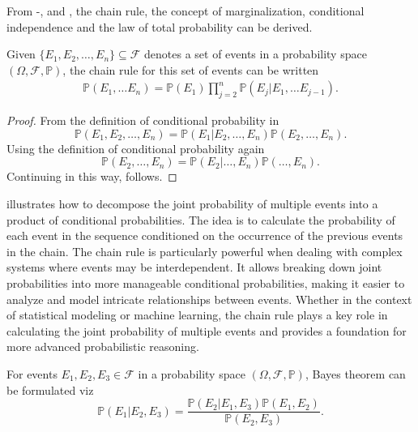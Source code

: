 From -,  and , the chain rule, the concept of marginalization, conditional independence and the law of total probability can be derived. 
\begin{theorem}
	\label{theorem:chain_rule}
	Given $\{E_1, E_2, \ldots, E_n\}\subseteq \mathcal{F}$ denotes a set of events in a probability space $(\Omega, \mathcal{F}, \mathbb{P})$, the chain rule for this set of events can be written
	\begin{equation}
		\begin{split}
			\mathbb{P}(E_1, \dots E_n) = \mathbb{P}(E_1)\prod_{j=2}^{n}\mathbb{P}(E_j|E_1,\dots E_{j-1}).
		\end{split}
		\label{eq:prod}
	\end{equation}
\end{theorem}
\begin{proof}
	From the definition of conditional probability in 
	\begin{equation}
		\mathbb{P}(E_1, E_2, \ldots, E_n) = \mathbb{P}(E_1|E_2, \dots, E_n)\mathbb{P}(E_2, \dots, E_n).
		\label{eq:p1}
	\end{equation}
	Using the definition of conditional probability again
	\begin{equation}
		\mathbb{P}(E_2, \ldots, E_n) = \mathbb{P}(E_2| \ldots, E_n)\mathbb{P}(\dots, E_n).
	\end{equation}
	Continuing in this way,  follows.
\end{proof}
 illustrates how to decompose the joint probability of multiple events into a product of conditional probabilities. The idea is to calculate the probability of each event in the sequence conditioned on the occurrence of the previous events in the chain. The chain rule is particularly powerful when dealing with complex systems where events may be interdependent. It allows breaking down joint probabilities into more manageable conditional probabilities, making it easier to analyze and model intricate relationships between events. Whether in the context of statistical modeling or machine learning, the chain rule plays a key role in calculating the joint probability of multiple events and provides a foundation for more advanced probabilistic reasoning.

\begin{theorem}
	\label{theorem:bayes_theorem}
	For events $E_1,E_2,E_3 \in \mathcal{F}$ in a probability space $(\Omega, \mathcal{F}, \mathbb{P})$, Bayes theorem can be formulated viz
	\begin{equation}
		\mathbb{P}(E_1| E_2,E_3) = \frac{\mathbb{P}(E_2| E_1,E_3)\mathbb{P}(E_1,E_2)}{\mathbb{P}(E_2,E_3)}.
		\label{bayes_theorem}
	\end{equation}
\end{theorem}

